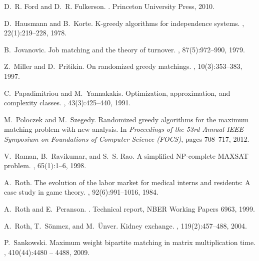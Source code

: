 \documentclass[a4paper,11pt]{article}
\begin{document}
{\begin{thebibliography}{10}
D.~R. Ford and D.~R. Fulkerson.
.
\newblock Princeton University Press, 2010.

D.~Hausmann and B.~Korte.
\newblock K-greedy algorithms for independence systems.
, 22(1):219--228, 1978.

B.~Jovanovic.
\newblock Job matching and the theory of turnover.
, 87(5):972--990, 1979.

Z.~Miller and D.~Pritikin.
\newblock On randomized greedy matchings.
, 10(3):353--383, 1997.

C.~Papadimitriou and M.~Yannakakis.
\newblock Optimization, approximation, and complexity classes.
, 43(3):425--440, 1991.

M.~Poloczek and M.~Szegedy.
\newblock Randomized greedy algorithms for the maximum matching problem with
  new analysis.
\newblock In {\em Proceedings of the 53rd Annual {IEEE} Symposium on
  Foundations of Computer Science ({FOCS})}, pages 708--717, 2012.

V.~Raman, B.~Ravikumar, and S.~S. Rao.
\newblock A simplified {NP}-complete {MAXSAT} problem.
, 65(1):1--6, 1998.

A.~Roth.
\newblock The evolution of the labor market for medical interns and residents:
  {A} case study in game theory.
, 92(6):991--1016, 1984.

A.~Roth and E.~Peranson.
.
\newblock Technical report, NBER Working Papers 6963, 1999.

A.~Roth, T.~S\"onmez, and M.~\"Unver.
\newblock Kidney exchange.
, 119(2):457--488, 2004.

P.~Sankowski.
\newblock Maximum weight bipartite matching in matrix multiplication time.
, 410(44):4480 -- 4488, 2009.

\end{thebibliography}
}
\end{document}

